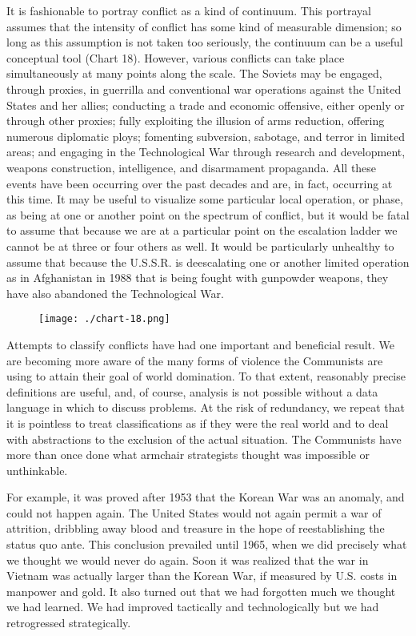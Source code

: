 It is fashionable to portray conflict as a kind of continuum. This portrayal assumes that the intensity of conflict has some kind of measurable dimension; so long as this assumption is not taken too seriously, the continuum can be a useful conceptual tool (Chart 18). However, various conflicts can take place simultaneously at many points along the scale. The Soviets may be engaged, through proxies, in guerrilla and conventional war operations against the United States and her allies; conducting a trade and economic offensive, either openly or through other proxies; fully exploiting the illusion of arms reduction, offering numerous diplomatic ploys; fomenting subversion, sabotage, and terror in limited areas; and engaging in the Technological War through research and development, weapons construction, intelligence, and disarmament propaganda. All these events have been occurring over the past decades and are, in fact, occurring at this time. It may be useful to visualize some particular local operation, or phase, as being at one or another point on the spectrum of conflict, but it would be fatal to assume that because we are at a particular point on the escalation ladder we cannot be at three or four others as well. It would be particularly unhealthy to assume that because the U.S.S.R. is deescalating one or another limited operation as in Afghanistan in 1988 that is being fought with gunpowder weapons, they have also abandoned the Technological War.

\begin{figure}[h!]
    \centering
    \texttt{[image: ./chart-18.png]}
\end{figure}

Attempts to classify conflicts have had one important and beneficial result. We are becoming more aware of the many forms of violence the Communists are using to attain their goal of world domination. To that extent, reasonably precise definitions are useful, and, of course, analysis is not possible without a data language in which to discuss problems. At the risk of redundancy, we repeat that it is pointless to treat classifications as if they were the real world and to deal with abstractions to the exclusion of the actual situation. The Communists have more than once done what armchair strategists thought was impossible or unthinkable.

For example, it was proved after 1953 that the Korean War was an anomaly, and could not happen again. The United States would not again permit a war of attrition, dribbling away blood and treasure in the hope of reestablishing the status quo ante. This conclusion prevailed until 1965, when we did precisely what we thought we would never do again. Soon it was realized that the war in Vietnam was actually larger than the Korean War, if measured by U.S. costs in manpower and gold. It also turned out that we had forgotten much we thought we had learned. We had improved tactically and technologically but we had retrogressed strategically.

